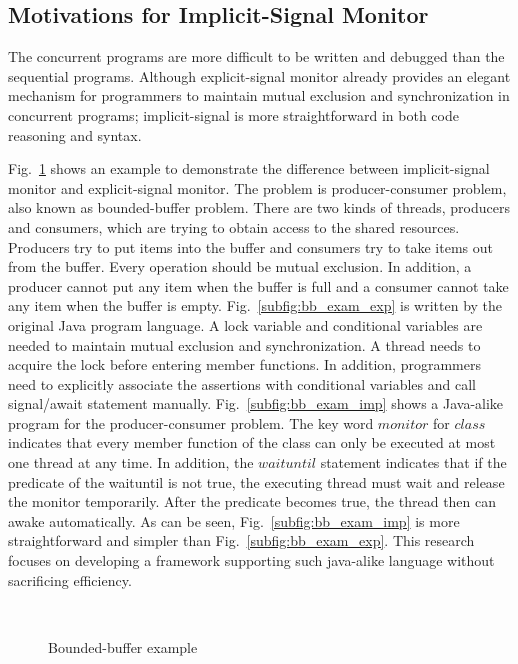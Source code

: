 \documentclass[preprint]{sigplanconf}
\begin{document}
\subsection{Motivations for Implicit-Signal Monitor}
The concurrent programs are more difficult to be written and debugged than the 
sequential programs. Although explicit-signal monitor already provides an 
elegant mechanism for programmers to maintain mutual exclusion and synchronization 
in concurrent programs; implicit-signal is more straightforward in both code
reasoning and syntax. 

Fig.~\ref{fig:bb_exp} shows an example to
demonstrate the difference between implicit-signal monitor and explicit-signal 
monitor. The problem is producer-consumer problem, also known as bounded-buffer
problem. There are two kinds of threads, producers and consumers, which are 
trying to obtain access to the shared resources. Producers try to put items 
into the buffer and consumers try to take items out from the buffer. Every 
operation should be mutual exclusion. In addition, a producer cannot put any 
item when the buffer is full and a consumer cannot take any item when the 
buffer is empty. Fig.~\ref{subfig:bb_exam_exp} is written by the original Java
program language. A lock variable and conditional variables are
needed to maintain mutual exclusion and synchronization. A thread needs to
acquire the lock before entering member functions. In addition, programmers need
to explicitly associate the assertions with conditional variables and call
signal/await statement manually. Fig.~\ref{subfig:bb_exam_imp} shows a Java-alike
program for the producer-consumer problem. The key word $monitor$ for $class$
indicates that every member function of the class can only be executed at most
one thread at any time. In addition, the $waituntil$ statement indicates that if
the predicate of the waituntil is not true, the executing thread must wait and
release the monitor temporarily. After the predicate becomes true, the thread
then can awake automatically. As can be seen, Fig.~\ref{subfig:bb_exam_imp} is
more straightforward and simpler than Fig.~\ref{subfig:bb_exam_exp}. This research
focuses on developing a framework supporting such java-alike language without 
sacrificing efficiency.




\begin{figure}
  \centering
  \\
  \caption{Bounded-buffer example}
  \label{fig:bb_exp}
\end{figure}
\end{document}
